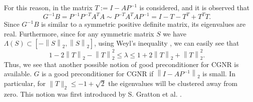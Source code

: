 \documentclass[hidelinks,onefignum,onetabnum]{siamart220329}
\newcommand{\bb}[1]{#1}
\newcommand{\norm}[1]{\left\lVert#1\right\rVert}
\begin{document}
For this reason, in \cite{WathenNormal} the matrix ${T}:= I - {A}{P}^{-1}$ is considered, and it is observed that
\begin{equation}
    \label{eq:specEquiv}
    {G}^{-1}{B} = {P}^{-1}{P}^{-T}{A}^T{A}\sim {P}^{-T}{A}^T{A}{P}^{-1} = {I} - {T} - {T}^T + {T}^T{T}.
\end{equation}
Since ${G}^{-1}{B}$ is similar to a symmetric positive definite matrix, its eigenvalues are real. Furthermore, since for any symmetric matrix ${S}$ we have $\Lambda({S})\subset [-\norm{{S}}_2, \norm{{S}}_2]$, using Weyl's inequality \cite{horn,stewart}, we can easily see that
\begin{equation}
    1 - 2\norm{{T}}_2 - \norm{{T}}_2^2 \leq \lambda \leq 1 + 2\norm{{T}}_2 + \norm{{T}}_2^2.
\end{equation}
Thus, we see that another possible notion of good preconditioner for CGNR is available. $G$ is a good preconditioner for CGNR if $\norm{I-{A}{P}^{-1}}_2$ is small. \bb{In particular, for $\|T\|_2\leq -1 + \sqrt{2}$ the eigenvalues will be clustered away from zero}. This notion was first introduced by S. Gratton et al. \cite{Gratton}.
\end{document}
